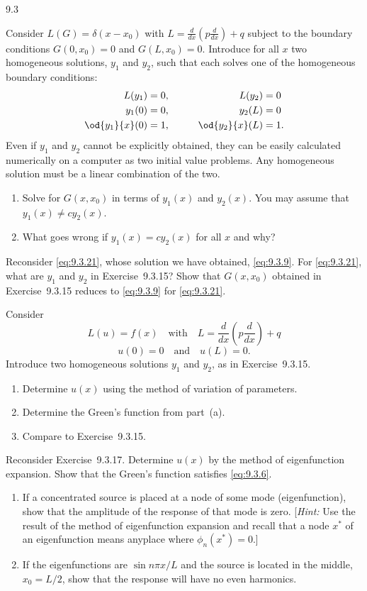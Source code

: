 \begin{exercises}{9.3}
\item Consider $L(G) = \delta(x - x_0)$ with $L = \frac{d}{d x}\!\left(p\frac{d}{d x}\right) + q$ subject to the boundary conditions $G(0,x_0) = 0$ and $G(L,x_0) = 0$.  Introduce for all $x$ two homogeneous solutions, $y_1$ and $y_2$, such that each solves one of the homogeneous boundary conditions:
\begin{alignat*}{2}
L(y_1) &= 0, &\qquad L(y_2) &= 0 \\
y_1(0) &= 0, &\qquad y_2(L) &= 0 \\
\od{y_1}{x}(0) &= 1, &\qquad \od{y_2}{x}(L) &= 1.
\end{alignat*}
Even if $y_1$ and $y_2$ cannot be explicitly obtained, they can be easily calculated numerically on a computer as two initial value problems.  Any homogeneous solution must be a linear combination of the two.
\begin{enumerate}
\item[\starred(a)] Solve for $G(x,x_0)$ in terms of $y_1(x)$ and $y_2(x)$.  You may assume that $y_1(x) \neq cy_2(x)$.
\item[(b)] What goes wrong if $y_1(x) = cy_2(x)$ for all $x$ and why?
\end{enumerate}

\item Reconsider \eqref{eq:9.3.21}, whose solution we have obtained, \eqref{eq:9.3.9}.  For \eqref{eq:9.3.21}, what are $y_1$ and $y_2$ in Exercise~9.3.15?  Show that $G(x,x_0)$ obtained in Exercise~9.3.15 reduces to \eqref{eq:9.3.9} for \eqref{eq:9.3.21}.

\item Consider
\[
L(u) = f(x) \quad\text{with}\quad L = \frac{d}{d x}\!\left(p\frac{d}{d x}\right) + q
\]
\[
u(0) = 0 \quad\text{and}\quad u(L) = 0.
\]
Introduce two homogeneous solutions $y_1$ and $y_2$, as in Exercise~9.3.15.
\begin{enumerate}
\item[(a)] Determine $u(x)$ using the method of variation of parameters.
\item[(b)] Determine the Green's function from part~(a).
\item[(c)] Compare to Exercise~9.3.15.
\end{enumerate}

\item Reconsider Exercise~9.3.17.  Determine $u(x)$ by the method of eigenfunction expansion.  Show that the Green's function satisfies \eqref{eq:9.3.6}.

\item
\begin{enumerate}
\item[(a)] If a concentrated source is placed at a node of some mode (eigenfunction), show that the amplitude of the response of that mode is zero.  [\textit{Hint:} Use the result of the method of eigenfunction expansion and recall that a node $x^*$ of an eigenfunction means anyplace where $\phi_n(x^*)=0$.]
\item[(b)] If the eigenfunctions are $\sin n\pi x/L$ and the source is located in the middle, $x_0 = L/2$, show that the response will have no even harmonics.
\end{enumerate}


\end{exercises}
